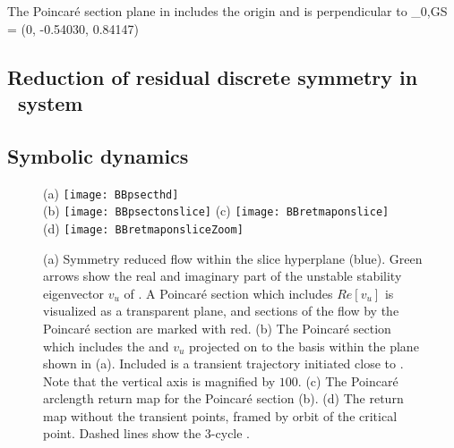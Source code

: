 The Poincar\'e section plane in  includes the origin 
and is
perpendicular to
\beq
	_{0,GS} = (0, -0.54030, 0.84147)
	\label{eq:nhat0GS-1}
\eeq


\subsection{Reduction of residual discrete symmetry in \twoMode\ system}


\subsection{Symbolic dynamics}


\begin{figure}
\centering
  (a) \texttt{[image: BBpsecthd]} \\
  (b) \texttt{[image: BBpsectonslice]}
  (c) \texttt{[image: BBretmaponslice]} \\
  (d) \texttt{[image: BBretmaponsliceZoom]}
\caption{(a) Symmetry reduced flow within the slice hyperplane (blue).
			Green arrows show the real and imaginary part of the unstable stability
			eigenvector $v_u$ of . A Poincar\'e section which includes
			$Re[v_u]$ is visualized as a transparent plane, and sections
			of the flow by the Poincar\'e section are marked with red.
		 (b) The Poincar\'e section which includes the  and $v_u$ projected
			on to the basis within the plane shown in (a). Included is a
            transient trajectory initiated close to . Note that
		  	the vertical axis is magnified by $100$.
		 (c) The Poincar\'e arclength return map for the
		    Poincar\'e section (b).
		 (d) The return map without the transient points, framed by
            orbit of the critical point.
		 	Dashed lines show the 3-cycle .}
\label{fig:psectandretmap}
\end{figure}


